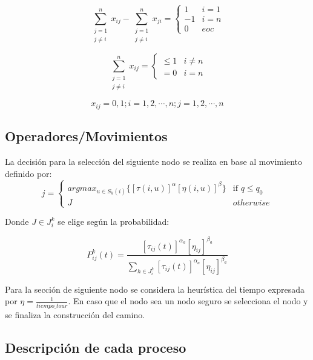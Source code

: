 \begin{equation}\label{full}
	\sum_{\substack{j=1\\
                  j \neq i}}^n x_{ij} - \sum_{\substack{j=1\\
                  j \neq i}}^{n} x_{ji} = \begin{cases}
1 & i=1\\
-1 & i=n \\
0 & eoc
\end{cases}
\end{equation}



\begin{equation}\label{circles}
	\sum_{\substack{j=1\\
                  j \neq i}}^n x_{ij} = \begin{cases}
\leq 1 & i\neq n\\
=0 & i=n 
\end{cases}
\end{equation}

\begin{equation}
	x_{ij} = 0,1;i=1,2,\cdots,n;j=1,2,\cdots,n
\end{equation}
\subsection{Operadores/Movimientos}
La decisión para la selección del siguiente nodo se realiza en base al movimiento  definido por:
\begin{equation}
j = \begin{cases} arg max_{u \in S_{k}(i)} \{ [\tau(i,u)]^\alpha [\eta(i,u)]^\beta\} &\mbox{if } q \leq q_0 \\ 
J & otherwise \end{cases} 
\end{equation}

Donde $J \in J_i^k$ se elige según la probabilidad:

	\begin{equation}
		P_{ij}^k(t) = \frac{[\tau_{ij}(t)]^{\alpha_a}[\eta_{ij}]^{\beta_a}}{\sum_{h \in J_i^k } [\tau_{ij}(t)]^{\alpha_a}[\eta_{ij}]^{\beta_a}}
	\end{equation}
	
Para la sección de siguiente nodo se considera la heurística del tiempo expresada por $\eta = \frac{1}{tiempo\_tour}$.
En caso que el nodo sea un nodo seguro se selecciona el nodo y se finaliza la construcción del camino.
\subsection{Descripción de cada proceso}

